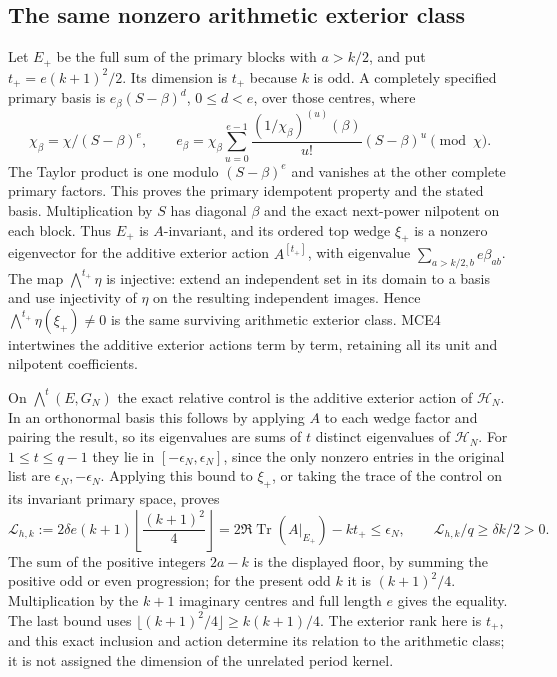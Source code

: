 \documentclass[11pt,a4paper]{article}
\begin{document}
\subsection{The same nonzero arithmetic exterior class}
Let $E_+$ be the full sum of the primary blocks with $a>k/2$,
and put $t_+=e(k+1)^2/2$. Its dimension is $t_+$ because
$k$ is odd. A completely specified primary basis is
$e_\beta(S-\beta)^d$, $0\le d<e$, over those centres, where
\[
 \chi_\beta=\chi/(S-\beta)^e,\qquad
 e_\beta=\chi_\beta\sum_{u=0}^{e-1}
       \frac{(1/\chi_\beta)^{(u)}(\beta)}{u!}(S-\beta)^u
                                  \pmod\chi.
 \tag{MCE9}
\]
The Taylor product is one modulo $(S-\beta)^e$ and vanishes at
the other complete primary factors. This proves the primary
idempotent property and the stated basis. Multiplication by $S$
has diagonal $\beta$ and the exact next-power nilpotent on each
block. Thus $E_+$ is $A$-invariant, and its ordered top wedge
$\xi_+$ is a nonzero eigenvector for the additive exterior action
$A^{[t_+]}$, with eigenvalue $\sum_{a>k/2,b}e\beta_{ab}$.
The map $\bigwedge^{t_+}\eta$ is injective: extend an independent
set in its domain to a basis and use injectivity of $\eta$ on
the resulting independent images. Hence
$\bigwedge^{t_+}\eta(\xi_+)\ne0$ is the same surviving arithmetic
exterior class. MCE4 intertwines the additive exterior actions
term by term, retaining all its unit and nilpotent coefficients.

On $\bigwedge^t(E,G_N)$ the exact relative control is the additive
exterior action of $\mathcal H_N$. In an orthonormal basis this
follows by applying $A$ to each wedge factor and pairing the
result, so its eigenvalues are sums of $t$ distinct eigenvalues
of $\mathcal H_N$. For $1\le t\le q-1$ they lie in
$[-\epsilon_N,\epsilon_N]$, since the only nonzero entries in
the original list are $\epsilon_N,-\epsilon_N$. Applying this
bound to $\xi_+$, or taking the trace of the control on its
invariant primary space, proves
\[
 \mathcal L_{h,k}
  :=2\delta e(k+1)\left\lfloor\frac{(k+1)^2}{4}\right\rfloor
  =2\Re\operatorname{Tr}(A|_{E_+})-kt_+
  \le\epsilon_N,
 \qquad \mathcal L_{h,k}/q\ge\delta k/2>0.
 \tag{MCE10}
\]
The sum of the positive integers $2a-k$ is the displayed floor,
by summing the positive odd or even progression; for the present
odd $k$ it is $(k+1)^2/4$. Multiplication by the $k+1$ imaginary
centres and full length $e$ gives the equality. The last bound
uses $\lfloor(k+1)^2/4\rfloor\ge k(k+1)/4$. The exterior rank
here is $t_+$, and this exact inclusion and action determine its
relation to the arithmetic class; it is not assigned the dimension
of the unrelated period kernel.
\end{document}
